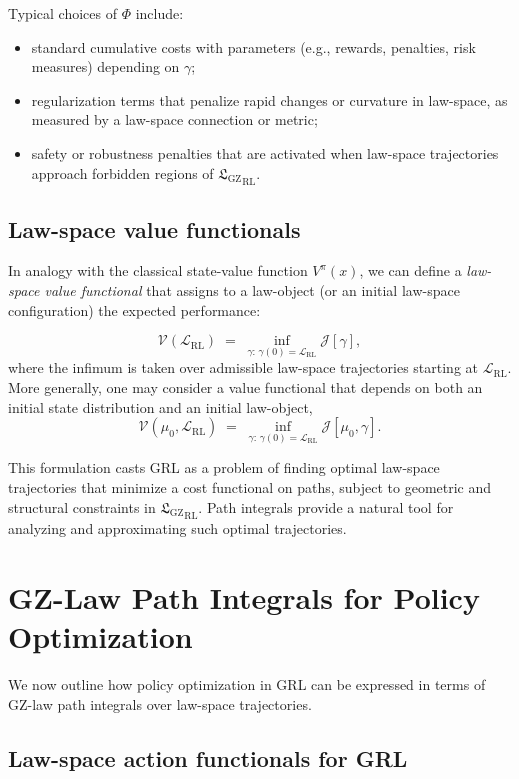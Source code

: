 \documentclass[11pt]{book}
\newcommand{\GZLS}{\ensuremath{\mathfrak{L}_{\mathrm{GZ}}}}
\theoremstyle{plain}
\theoremstyle{definition}
\theoremstyle{remark}
\begin{document}
Typical choices of $\Phi$ include:
\begin{itemize}
  \item standard cumulative costs with parameters (e.g., rewards,
        penalties, risk measures) depending on $\gamma$;
  \item regularization terms that penalize rapid changes or
        curvature in law-space, as measured by a law-space
        connection or metric;
  \item safety or robustness penalties that are activated when
        law-space trajectories approach forbidden regions of
        ${\GZLS}_{\mathrm{RL}}$.
\end{itemize}

\subsection*{Law-space value functionals}

In analogy with the classical state-value function $V^\pi(x)$, we
can define a \emph{law-space value functional} that assigns to a
law-object (or an initial law-space configuration) the expected
performance:

\[
   \mathcal{V}(\mathcal{L}_{\mathrm{RL}})
   \;=\;
   \inf_{\gamma:\,\gamma(0)=\mathcal{L}_{\mathrm{RL}}}
   \mathcal{J}[\gamma],
\]
where the infimum is taken over admissible law-space trajectories
starting at $\mathcal{L}_{\mathrm{RL}}$. More generally, one may
consider a value functional that depends on both an initial state
distribution and an initial law-object,
\[
   \mathcal{V}(\mu_0,\mathcal{L}_{\mathrm{RL}})
   \;=\;
   \inf_{\gamma:\,\gamma(0)=\mathcal{L}_{\mathrm{RL}}}
   \mathcal{J}[\mu_0,\gamma].
\]

This formulation casts GRL as a problem of finding optimal
law-space trajectories that minimize a cost functional on paths,
subject to geometric and structural constraints in ${\GZLS}_{\mathrm{RL}}$.
Path integrals provide a natural tool for analyzing and approximating
such optimal trajectories.

\section{GZ-Law Path Integrals for Policy Optimization}
\label{sec:gzlaw-path-integrals-policy}


We now outline how policy optimization in GRL can be expressed in
terms of GZ-law path integrals over law-space trajectories.

\subsection*{Law-space action functionals for GRL}
\end{document}
